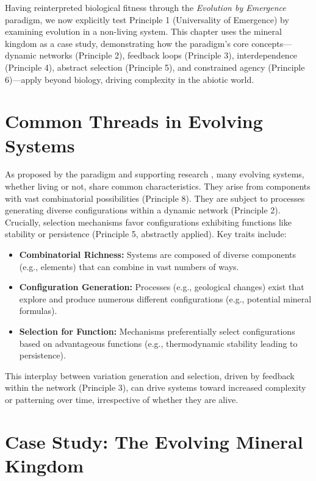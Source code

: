 \documentclass[12pt,openany]{book}
\begin{document}
Having reinterpreted biological fitness through the \emph{Evolution by Emergence} paradigm, we now explicitly test Principle 1 (Universality of Emergence) by examining evolution in a non-living system. This chapter uses the mineral kingdom as a case study, demonstrating how the paradigm's core concepts—dynamic networks (Principle 2), feedback loops (Principle 3), interdependence (Principle 4), abstract selection (Principle 5), and constrained agency (Principle 6)—apply beyond biology, driving complexity in the abiotic world. %

\section*{Common Threads in Evolving Systems}

As proposed by the paradigm and supporting research \cite{WongEtAl2023}, many evolving systems, whether living or not, share common characteristics. They arise from components with vast combinatorial possibilities (Principle 8). They are subject to processes generating diverse configurations within a dynamic network (Principle 2). Crucially, selection mechanisms favor configurations exhibiting functions like stability or persistence (Principle 5, abstractly applied). Key traits include:
\begin{itemize}
    \item \textbf{Combinatorial Richness:} Systems are composed of diverse components (e.g., elements) that can combine in vast numbers of ways.
    \item \textbf{Configuration Generation:} Processes (e.g., geological changes) exist that explore and produce numerous different configurations (e.g., potential mineral formulas).
    \item \textbf{Selection for Function:} Mechanisms preferentially select configurations based on advantageous functions (e.g., thermodynamic stability leading to persistence).
\end{itemize}
This interplay between variation generation and selection, driven by feedback within the network (Principle 3), can drive systems toward increased complexity or patterning over time, irrespective of whether they are alive. %

\section*{Case Study: The Evolving Mineral Kingdom}
\end{document}
